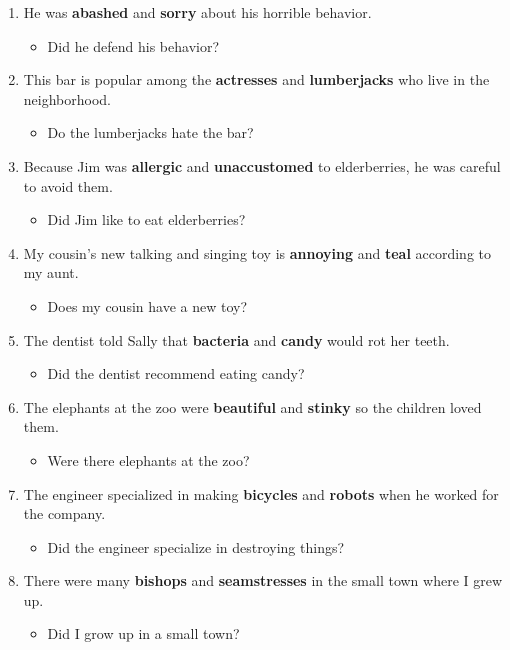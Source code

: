 \documentclass[authoryear]{elsarticle}
\begin{document}
\begin{enumerate}
\item He was \textbf{abashed} and \textbf{sorry} about his horrible behavior.	\begin{itemize} \item Did he defend his behavior?\end{itemize}
\item This bar is popular among the \textbf{actresses} and \textbf{lumberjacks} who live in the neighborhood.	\begin{itemize} \item Do the lumberjacks hate the bar?\end{itemize}
\item Because Jim was \textbf{allergic} and \textbf{unaccustomed} to elderberries, he was careful to avoid them.	\begin{itemize} \item Did Jim like to eat elderberries?\end{itemize}
\item My cousin's new talking and singing toy is \textbf{annoying} and \textbf{teal} according to my aunt.	\begin{itemize} \item Does my cousin have a new toy?\end{itemize}
\item The dentist told Sally that \textbf{bacteria} and \textbf{candy} would rot her teeth.	\begin{itemize} \item Did the dentist recommend eating candy?\end{itemize}
\item The elephants at the zoo were \textbf{beautiful} and \textbf{stinky} so the children loved them.	\begin{itemize} \item Were there elephants at the zoo?\end{itemize}
\item The engineer specialized in making \textbf{bicycles} and \textbf{robots} when he worked for the company.	\begin{itemize} \item Did the engineer specialize in destroying things?\end{itemize}
\item There were many \textbf{bishops} and \textbf{seamstresses} in the small town where I grew up.	\begin{itemize} \item Did I grow up in a small town?\end{itemize}

\end{enumerate}
\end{document}
